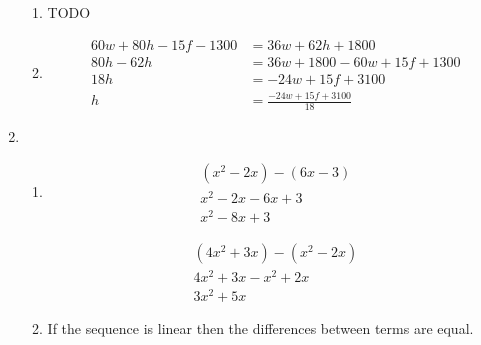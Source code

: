 \documentclass[11pt]{article}
\begin{document}
\begin{enumerate}
\begin{enumerate}
            \item
                TODO
            \item
            \begin{equation*}
                \begin{split}
                    60w+80h-15f-1300&=36w+62h+1800\\
                    80h-62h&=36w+1800-60w+15f+1300\\
                    18h&=-24w+15f+3100\\
                    h&=\frac{-24w+15f+3100}{18}
                \end{split}
            \end{equation*}
        \end{enumerate}

    \pagebreak
    \item
        \begin{enumerate}
            \item
                \begin{minipage}{0.5\textwidth}
                    \begin{equation*}
                        \begin{split}
                            (x^2-2x)-(6x-3)\\
                            x^2-2x-6x+3\\
                            x^2-8x+3
                        \end{split}
                    \end{equation*}
                \end{minipage}%
                \begin{minipage}{0.5\textwidth}
                    \begin{equation*}
                        \begin{split}
                            (4x^2+3x)-(x^2-2x)\\
                            4x^2+3x-x^2+2x\\
                            3x^2+5x
                        \end{split}
                    \end{equation*}
                \end{minipage}
            \item If the sequence is linear then the differences between terms are equal.
                \begin{equation*}
                    \begin{split}

\end{split}
\end{equation*}
\end{enumerate}
\end{enumerate}
\end{document}
